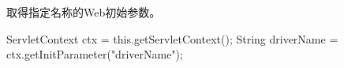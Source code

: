  取得指定名称的Web初始参数。

\begin{javaCode}
  ServletContext ctx = this.getServletContext();
  String driverName = ctx.getInitParameter("driverName");  
\end{javaCode}

